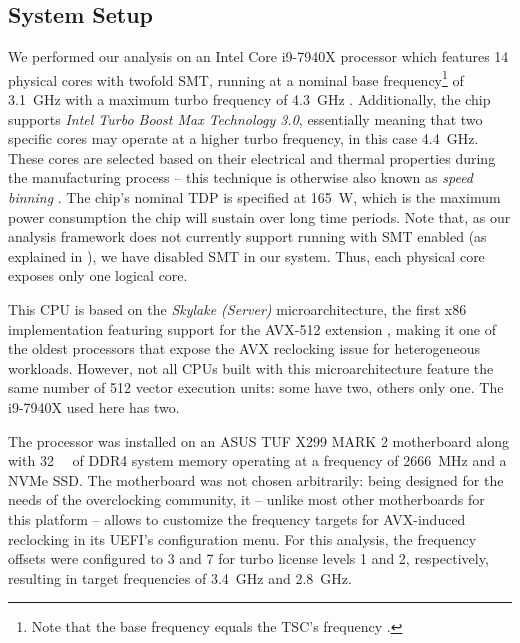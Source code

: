 \subsection{System Setup}
\label{sec:analysis:results:systemsetup}

We performed our analysis on an Intel Core i9-7940X processor which features 14 physical cores with twofold \gls{SMT}, running at a nominal base frequency\footnote{Note that the base frequency equals the \gls{TSC}'s frequency \cite{intelsdmsysprogguide}.} of \SI{3.1}{\giga\hertz} with a maximum turbo frequency of \SI{4.3}{\giga\hertz} \cite{intel7940x}. Additionally, the chip supports \textit{Intel Turbo Boost Max Technology 3.0}, essentially meaning that two specific cores may operate at a higher turbo frequency, in this case \SI{4.4}{\giga\hertz}. These cores are selected based on their electrical and thermal properties during the manufacturing process \cite{intelxeonscalabledeepdive} -- this technique is otherwise also known as \textit{speed binning} \cite{lopata2012speed}. The chip's nominal \gls{TDP} is specified at \SI{165}{\watt}, which is the maximum power consumption the chip will sustain over long time periods. Note that, as our analysis framework does not currently support running with \gls{SMT} enabled (as explained in ), we have disabled \gls{SMT} in our system. Thus, each physical core exposes only one logical core.

This \gls{CPU} is based on the \textit{Skylake (Server)} microarchitecture, the first \gls{x86} implementation featuring support for the \gls{AVX-512} extension \cite{intelxeonscalabledeepdive}, making it one of the oldest processors that expose the \gls{AVX} reclocking issue for heterogeneous workloads. However, not all \glspl{CPU} built with this microarchitecture feature the same number of \SI[number-unit-product=-]{512}{\bit} vector execution units: some have two, others only one. The i9-7940X used here has two.

The processor was installed on an ASUS TUF X299 MARK 2 motherboard along with \SI{32}{\gibi\byte} of DDR4 system memory operating at a frequency of \SI{2666}{\mega\hertz} and a \gls{NVMe} \acrlong{SSD}. The motherboard was not chosen arbitrarily: being designed for the needs of the overclocking community, it -- unlike most other motherboards for this platform -- allows to customize the frequency targets for \gls{AVX}-induced reclocking in its \gls{UEFI}'s configuration menu. For this analysis, the frequency offsets were configured to 3 and 7 for turbo license levels 1 and 2, respectively, resulting in target frequencies of \SI{3.4}{\giga\hertz} and \SI{2.8}{\giga\hertz}.

